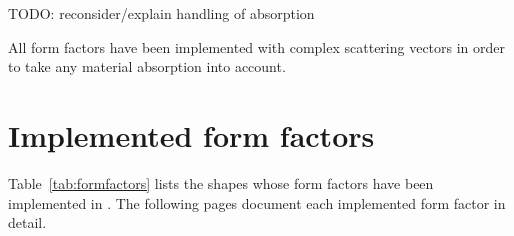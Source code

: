 TODO: reconsider/explain handling of absorption

All form factors have been implemented with complex scattering vectors
in order to take any material absorption into account.

\newpage
\section{Implemented form factors}

Table~\ref{tab:formfactors} lists the shapes whose form
factors have been implemented in \BornAgain.
The following pages document each implemented form factor in detail.


